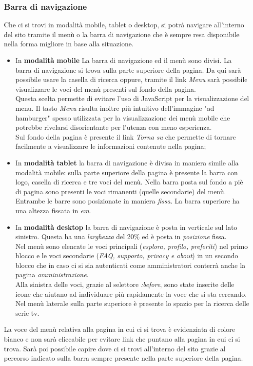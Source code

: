 \subsubsection{Barra di navigazione}
Che ci si trovi in modalità mobile, tablet o desktop, si potrà navigare all'interno del sito tramite il menù o la barra di navigazione che è sempre resa disponibile nella forma migliore in base alla situazione.\\
\begin{itemize}
	\item In \textbf{modalità mobile} La barra di navigazione ed il menù sono divisi. La barra di navigazione si trova sulla parte superiore della pagina. Da qui sarà possibile usare la casella di ricerca oppure, tramite il link \textit{Menu} sarà possibile visualizzare le voci del menù presenti sul fondo della pagina.\\
	Questa scelta permette di evitare l'uso di JavaScript per la visualizzazione del menu. Il tasto \textit{Menu} risulta inoltre più intuitivo dell'immagine "ad hamburger" spesso utilizzata per la visualizzazione dei menù mobile che potrebbe rivelarsi disorientante per l'utenza con meno esperienza.\\
	Sul fondo della pagina è presente il link \textit{Torna su} che permette di tornare facilmente a visualizzare le informazioni contenute nella pagina;
	
	\item In \textbf{modalità tablet} la barra di navigazione è divisa in maniera simile alla modalità mobile: sulla parte superiore della pagina è presente la barra con logo, casella di ricerca e tre voci del menù. Nella barra posta sul fondo a piè di pagina sono presenti le voci rimanenti (quelle secondarie) del menù. \\
	Entrambe le barre sono posizionate in maniera \textit{fissa}. La barra superiore ha una altezza fissata in \textit{em}.\\
	
	\item In \textbf{modalità desktop} la barra di navigazione è posta in verticale sul lato sinistro. Questa ha una \textit{larghezza} del 20\% ed è posta in \textit{posizione} fissa.\\
	Nel menù sono elencate le voci principali (\textit{esplora, profilo, preferiti}) nel primo blocco e le voci secondarie (\textit{FAQ, supporto, privacy e about}) in un secondo blocco che in caso ci si sia autenticati  come amministratori conterrà anche la pagina \textit{amministrazione}.\\
	Alla sinistra delle voci, grazie al selettore \textit{:before}, sono state inserite delle icone che aiutano ad individuare più rapidamente la voce che si sta cercando.\\
	Nel menù laterale sulla parte superiore è presente lo spazio per la ricerca delle serie tv.
\end{itemize}
	La voce del menù relativa alla pagina in cui ci si trova è evidenziata di colore bianco e non sarà cliccabile per evitare link che puntano alla pagina in cui ci si trova.
	Sarà poi possibile capire dove ci si trovi all'interno del sito grazie al percorso indicato sulla barra sempre presente nella parte superiore della pagina.


